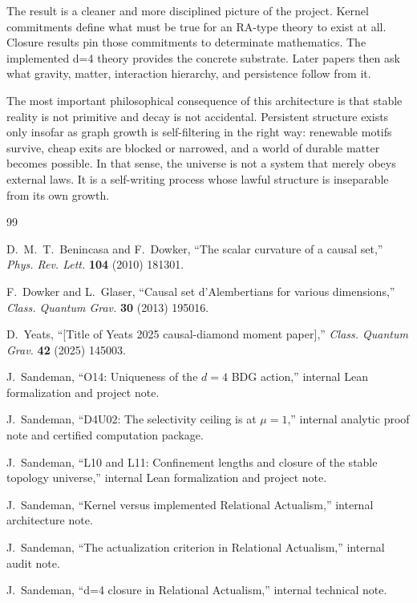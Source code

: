 \documentclass[11pt]{article}
\begin{document}
The result is a cleaner and more disciplined picture of the project. Kernel commitments define what must be true for an RA-type theory to exist at all. Closure results pin those commitments to determinate mathematics. The implemented d=4 theory provides the concrete substrate. Later papers then ask what gravity, matter, interaction hierarchy, and persistence follow from it.

The most important philosophical consequence of this architecture is that stable reality is not primitive and decay is not accidental. Persistent structure exists only insofar as graph growth is self-filtering in the right way: renewable motifs survive, cheap exits are blocked or narrowed, and a world of durable matter becomes possible. In that sense, the universe is not a system that merely obeys external laws. It is a self-writing process whose lawful structure is inseparable from its own growth.

\begin{thebibliography}{99}

D.~M.~T.~Benincasa and F.~Dowker,
``The scalar curvature of a causal set,''
\emph{Phys. Rev. Lett.} \textbf{104} (2010) 181301.

F.~Dowker and L.~Glaser,
``Causal set d'Alembertians for various dimensions,''
\emph{Class. Quantum Grav.} \textbf{30} (2013) 195016.

D.~Yeats,
``[Title of Yeats 2025 causal-diamond moment paper],''
\emph{Class. Quantum Grav.} \textbf{42} (2025) 145003.

J.~Sandeman,
``O14: Uniqueness of the $d=4$ BDG action,''
internal Lean formalization and project note.

J.~Sandeman,
``D4U02: The selectivity ceiling is at $\mu=1$,''
internal analytic proof note and certified computation package.

J.~Sandeman,
``L10 and L11: Confinement lengths and closure of the stable topology universe,''
internal Lean formalization and project note.

J.~Sandeman,
``Kernel versus implemented Relational Actualism,''
internal architecture note.

J.~Sandeman,
``The actualization criterion in Relational Actualism,''
internal audit note.

J.~Sandeman,
``d=4 closure in Relational Actualism,''
internal technical note.

\end{thebibliography}
\end{document}
